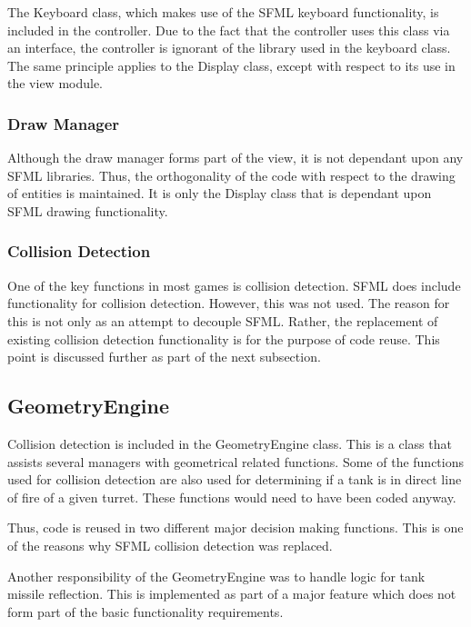 \documentclass[10pt,twocolumn]{witseiepaper}
\begin{document}
The Keyboard class, which makes use of the SFML keyboard functionality, is included in the controller. Due to the fact that the controller uses this class via an interface, the controller is ignorant of the library used in the keyboard class. The same principle applies to the Display class, except with respect to its use in the view module. 

\subsubsection{Draw Manager} Although the draw manager forms part of the view, it is not dependant upon any SFML libraries. Thus, the orthogonality of the code with respect to the drawing of entities is maintained. It is only the Display class that is dependant upon SFML drawing functionality.

\subsubsection{Collision Detection} One of the key functions in most games is collision detection. SFML does include functionality for collision detection. However, this was not used. The reason for this is not only as an attempt to decouple SFML. Rather, the replacement of existing collision detection functionality is for the purpose of code reuse. This point is discussed further as part of the next subsection.

\subsection{GeometryEngine}
Collision detection is included in the GeometryEngine class. This is a class that assists several managers with geometrical related functions. Some of the functions used for collision detection are also used for determining if a tank is in direct line of fire of a given turret. These functions would need to have been coded anyway. 

Thus, code is reused in two different major decision making functions. This is one of the reasons why SFML collision detection was replaced. 

Another responsibility of the GeometryEngine was to handle logic for tank missile reflection. This is implemented as part of a major feature which does not form part of the basic functionality requirements.


\end{document}
